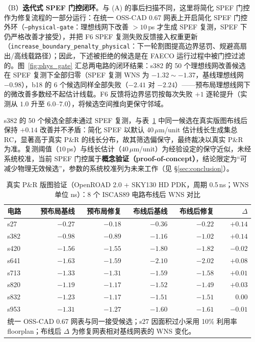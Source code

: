 \documentclass[journal]{IEEEtran}
\begin{document}
（B）\textbf{迭代式 SPEF 门控闭环}。与 (A) 的事后扫描不同，这里将简化 SPEF 门控作为修复流程的一部分运行：在统一 OSS-CAD 0.67 网表上开启简化 SPEF 门控外环（\texttt{--physical-gate}：理想线网下改善 $>10\,$ps 才生成 SPEF 复测，SPEF 下仍严格改善才接受），并把 F6 SPEF 复测失败反馈接入权重更新（\texttt{increase\_boundary\_penalty\_physical}：下一轮割图提高边界惩罚、规避高扇出/高线载路径）；因此，下述被拒绝的候选是在 FAECO 运行过程中被门控过滤的。图~\ref{fig:phys_gate} 汇总两电路的闭环结果：s382 的 50 个理想线网改善候选在 SPEF 复测下全部归零（SPEF 复测 WNS 为 $-1.32\sim-1.37$，基线理想线网 $-0.98$），b18 的 6 个候选同样全部失败（$-2.41$ 对 $-2.24$）——预布局理想线网下的微改善多数经不起估计线载。F6 反馈将边界惩罚按每次失败 $+1$ 逐轮提升（实测从 $1.0$ 升至 $6.0$--$7.0$），将候选空间推向更保守邻域。

s382 的 50 个候选全部未通过 SPEF 复测，与表~\ref{tab:pr8} 中同一候选在真实版图布线后保持 $+0.14$ 改善并不矛盾：简化 SPEF 以默认 40\,$\mu$m/unit 估计线长生成集总 RC，显著高于真实 P\&R 的线长分布，故其筛选偏保守，最终裁决以真实 P\&R 为准。复测阈值（$10\,$ps）与线长估计（$40\,\mu$m/unit）为经验设定的保守近似，未经系统校准，当前 SPEF 门控属于\textbf{概念验证（proof-of-concept）}，结论限定为“可减少物理无效候选”，参数的系统校准列为未来工作（见 \S\ref{sec:conclusion}）。

\begin{table}[!t]
\centering
\caption{真实 P\&R 版图验证（OpenROAD 2.0 + SKY130 HD PDK，周期 0.5\,ns；WNS 单位 ns）：8 个 ISCAS89 电路布线后 WNS 对比}
\label{tab:pr8}
\footnotesize
\setlength{\tabcolsep}{2.5pt}
\begin{tabular}{lrrrrr}
\toprule
\textbf{电路} & \textbf{预布局基线} & \textbf{预布局修复} & \textbf{布线后基线} & \textbf{布线后修复} & $\Delta$ \\
\midrule
s27  & $-0.27$ & $-0.18$ & $-0.36$ & $-0.22$ & $+0.14$ \\
s382 & $-0.98$ & $-0.89$ & $-1.16$ & $-1.02$ & $+0.14$ \\
s420 & $-1.56$ & $-1.55$ & $-1.80$ & $-1.82$ & $-0.02$ \\
s641 & $-1.63$ & $-1.59$ & $-2.10$ & $-2.02$ & $+0.08$ \\
s713 & $-1.33$ & $-1.31$ & $-1.59$ & $-1.58$ & $+0.01$ \\
s820 & $-1.19$ & $-1.17$ & $-1.52$ & $-1.49$ & $+0.03$ \\
s832 & $-1.23$ & $-1.17$ & $-1.51$ & $-1.51$ & $0.00$ \\
s953 & $-1.31$ & $-1.27$ & $-1.60$ & $-1.61$ & $-0.01$ \\
\bottomrule
\multicolumn{6}{p{0.92\columnwidth}}{\footnotesize 统一 OSS-CAD 0.67 网表与同一接受候选；s27 因面积过小采用 10\% 利用率 floorplan；布线后 $\Delta$ 为修复网表相对基线网表的 WNS 变化。}\\
\end{tabular}
\end{table}
\end{document}
